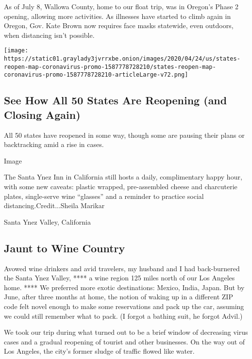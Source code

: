 As of July 8, Wallowa County, home to our float trip, was in Oregon's
Phase 2 opening, allowing more activities. As illnesses have started to
climb again in Oregon, Gov. Kate Brown now requires face masks
statewide, even outdoors, when distancing isn't possible.

\href{https://www.nytimes3xbfgragh.onion/interactive/2020/us/states-reopen-map-coronavirus.html}{}

\texttt{[image: https://static01.graylady3jvrrxbe.onion/images/2020/04/24/us/states-reopen-map-coronavirus-promo-1587778728210/states-reopen-map-coronavirus-promo-1587778728210-articleLarge-v72.png]}

\hypertarget{see-how-all-50-states-are-reopening-and-closing-again}{%
\subsection{See How All 50 States Are Reopening (and Closing
Again)}\label{see-how-all-50-states-are-reopening-and-closing-again}}

All 50 states have reopened in some way, though some are pausing their
plans or backtracking amid a rise in cases.

Image

The Santa Ynez Inn in California still hosts a daily, complimentary
happy hour, with some new caveats: plastic wrapped, pre-assembled cheese
and charcuterie plates, single-serve wine ``glasses'' and a reminder to
practice social distancing.Credit...Sheila Marikar

Santa Ynez Valley, California

\hypertarget{jaunt-to-wine-country}{%
\subsection{Jaunt to Wine Country}\label{jaunt-to-wine-country}}

Avowed wine drinkers and avid travelers, my husband and I had
back-burnered the Santa Ynez Valley, **** a wine region 125 miles north
of our Los Angeles home. **** We preferred more exotic destinations:
Mexico, India, Japan. But by June, after three months at home, the
notion of waking up in a different ZIP code felt novel enough to make
some reservations and pack up the car, assuming we could still remember
what to pack. (I forgot a bathing suit, he forgot Advil.)

We took our trip during what turned out to be a brief window of
decreasing virus cases and a gradual reopening of tourist and other
businesses. On the way out of Los Angeles, the city's former sludge of
traffic flowed like water.

